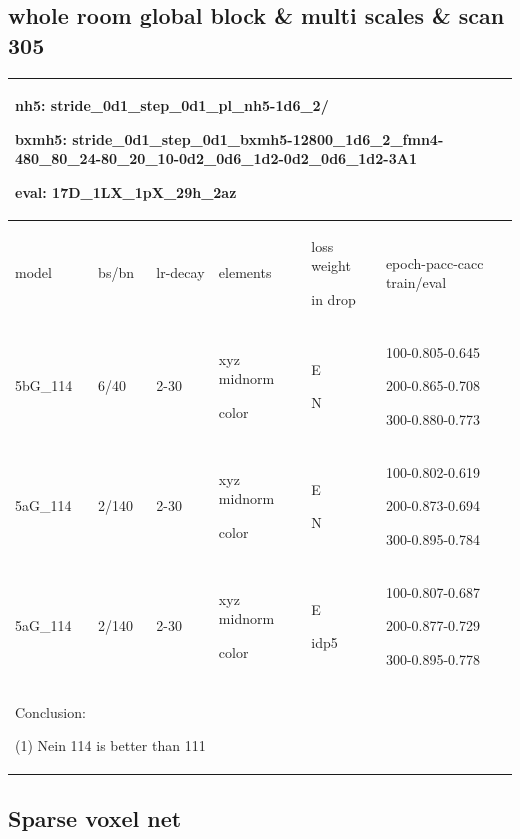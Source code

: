 \documentclass[,table,dvipsnames]{article}
\begin{document}
\subsection{whole room global block \& multi scales \& scan 305}
\begin{tabular}{|p{1.5cm}|p{1.5cm}|p{1cm}|p{2cm}|p{1.5cm}|p{6cm}| }
	\hline
	\multicolumn{6}{|p{12cm}|}{nh5: stride\_0d1\_step\_0d1\_pl\_nh5-1d6\_2/ \par bxmh5:  stride\_0d1\_step\_0d1\_bxmh5-12800\_1d6\_2\_fmn4-480\_80\_24-80\_20\_10-0d2\_0d6\_1d2-0d2\_0d6\_1d2-3A1 \par eval: 17D\_1LX\_1pX\_29h\_2az } \\
	\hline
	model & bs/bn& lr-decay & elements & loss weight\par in drop & epoch-pacc-cacc train/eval \\
	\hline
	5bG\_114 & 6/40 &2-30 & xyz midnorm\par color& E\par N &100-0.805-0.645\par 200-0.865-0.708 \par 300-0.880-0.773  \\
	\hline
	5aG\_114 & 2/140 &2-30 & xyz midnorm\par color& E\par N &100-0.802-0.619\par 200-0.873-0.694 \par 300-0.895-0.784  \\
	\hline
	5aG\_114 & 2/140 &2-30 & xyz midnorm\par color& E\par idp5 &100-0.807-0.687\par 200-0.877-0.729 \par 300-0.895-0.778  \\
	\hline
	
	\multicolumn{6}{|p{12cm}|}{ Conclusion:\par	(1) Nein 114 is better than 111  } \\
	\hline
\end{tabular}	


\subsection{Sparse voxel net}
\end{document}
